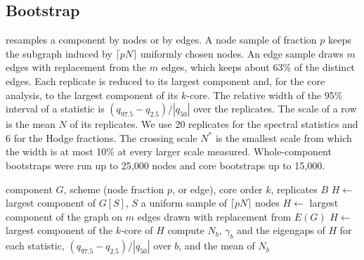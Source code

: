 \documentclass[11pt]{article}
\begin{document}
\subsection{Bootstrap}
 resamples a component by nodes or by edges. A node sample of fraction $p$ keeps the
subgraph induced by $\lceil pN \rceil$ uniformly chosen nodes. An edge sample draws $m$ edges with
replacement from the $m$ edges, which keeps about 63\% of the distinct edges. Each replicate is
reduced to its largest component and, for the core analysis, to the largest component of its
$k$-core. The relative width of the 95\% interval of a statistic is
$(q_{97.5} - q_{2.5}) / |q_{50}|$ over the replicates. The scale of a row is the mean $N$ of its
replicates. We use 20 replicates for the spectral statistics and 6 for the Hodge fractions. The
crossing scale $N^{*}$ is the smallest scale from which the width is at most 10\% at every larger
scale measured. Whole-component bootstraps were run up to 25,000 nodes and core bootstraps up to
15,000.

\begin{algorithm}
\caption{Bootstrap of a component.}\label{alg:boot}
\begin{algorithmic}[1]
\Require component $G$, scheme (node fraction $p$, or edge), core order $k$, replicates $B$
    \State $H \gets$ largest component of $G[S]$, $S$ a uniform sample of $\lceil pN\rceil$ nodes
  \Else
    \State $H \gets$ largest component of the graph on $m$ edges drawn with replacement from $E(G)$
  \EndIf
   \State $H \gets$ largest component of the $k$-core of $H$ \EndIf
  \State compute $N_b$, $\gamma_b$ and the eigengaps of $H$
\EndFor
\State \Return for each statistic, $(q_{97.5}-q_{2.5})/|q_{50}|$ over $b$, and the mean of $N_b$
\end{algorithmic}
\end{algorithm}
\end{document}
